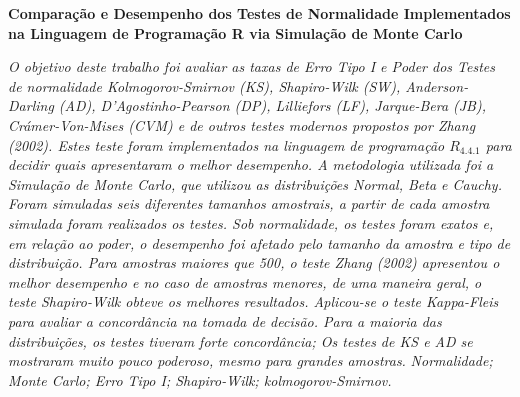 \documentclass[a4paper,11pt]{article} %
\begin{document}
\pagestyle{fancy}
\setcounter{page}{1}
\renewcommand{\thefootnote}{$\dagger$}
\lfoot{}
\rfoot{}
\setpagewiselinenumbers
\modulolinenumbers[1]
\linenumbers

\begin{center}
    {\large {\bf Comparação e Desempenho dos Testes de Normalidade Implementados na Linguagem de Programação R via Simulação de Monte Carlo}}\vspace{0.3cm} 
\end{center}
\begin{small}
 { \it
    O objetivo deste trabalho foi avaliar as taxas de Erro Tipo I e Poder dos Testes de normalidade Kolmogorov-Smirnov (KS), Shapiro-Wilk (SW), Anderson-Darling (AD), D’Agostinho-Pearson (DP), Lilliefors (LF), Jarque-Bera (JB), Crámer-Von-Mises (CVM) e de outros testes modernos propostos por Zhang (2002). Estes teste foram implementados na linguagem de programação $R_{4.4.1}$ para decidir quais apresentaram o melhor desempenho. A metodologia utilizada foi a Simulação de Monte Carlo, que utilizou as distribuições Normal, Beta e Cauchy. Foram simuladas seis diferentes tamanhos amostrais, a partir de cada amostra simulada foram realizados os testes. Sob normalidade, os testes foram exatos e, em relação ao poder, o desempenho foi afetado pelo tamanho da amostra e tipo de distribuição. Para amostras maiores que 500, o teste Zhang (2002) apresentou o melhor desempenho e no caso de amostras menores, de uma maneira geral, o teste Shapiro-Wilk obteve os melhores resultados. Aplicou-se o teste Kappa-Fleis para avaliar a concordância na tomada de decisão. Para a maioria das distribuições, os testes tiveram forte concordância; Os testes de KS e AD se mostraram muito pouco poderoso, mesmo para grandes amostras.
}\vspace{0.3cm}
 {\it Normalidade; Monte Carlo; Erro Tipo I; Shapiro-Wilk; kolmogorov-Smirnov.}\vspace{0.3cm}
\end{small}
\end{document}
